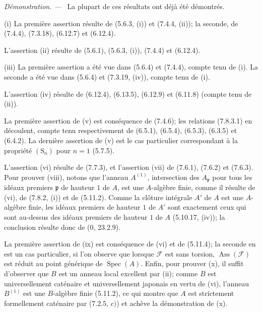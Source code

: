 \documentclass[10pt,oneside]{book}
\newenvironment{proof}{%
  \par\medskip\noindent\textit{Démonstration. ---\ }}{\par}
\begin{document}
\begin{proof}
La plupart de ces résultats ont déjà été démontrés.

(i) La première assertion résulte de (5.6.3, (i)) et (7.4.4, (ii)); la seconde,
de (7.4.4), (7.3.18), (6.12.7) et (6.12.4).

L'assertion (ii) résulte de (5.6.1), (5.6.3, (i)), (7.4.4) et (6.12.4).

(iii) La première assertion a été vue dans (5.6.4) et (7.4.4), compte tenu de
(i). La seconde a été vue dans (5.6.4) et (7.3.19, (iv)), compte tenu de (i).

L'assertion (iv) résulte de (6.12.4), (6.13.5), (6.12.9) et (6.11.8) (compte
tenu de (ii)).

La première assertion de (v) est conséquence de (7.4.6); les relations
(7.8.3.1) en découlent, compte tenu respectivement de (6.5.1), (6.5.4),
(6.5.3), (6.3.5) et (6.4.2). La dernière assertion de (v) est le cas
particulier correspondant à la propriété $(\mathrm S_n)$ pour $n=1$ (5.7.5).

L'assertion (vi) résulte de (7.7.3), et l'assertion (vii) de (7.6.1), (7.6.2)
et (7.6.3). Pour prouver (viii), notons que l'anneau $A^{(1)}$, intersection
des $A_{\mathfrak p}$ pour tous les idéaux premiers $\mathfrak p$ de hauteur
$1$ de $A$, est une $A$-algèbre finie, comme il résulte de (vi), de (7.8.2,
(i)) et de (5.11.2). Comme la clôture intégrale $A'$ de $A$ est une $A$-algèbre
finie, les idéaux premiers de hauteur $1$ de $A'$ sont exactement ceux qui sont
au-dessus des idéaux premiers de hauteur $1$ de $A$ (5.10.17, (iv)); la
conclusion résulte donc de (0, 23.2.9).

La première assertion de (ix) est conséquence de (vi) et de (5.11.4); la
seconde en est un cas particulier, si l'on observe que lorsque $\mathcal F$ est
sans torsion, $\operatorname{Ass}(\mathcal F)$ est réduit au point générique de
$\operatorname{Spec}(A)$. Enfin, pour prouver (x), il suffit d'observer que $B$
est un anneau local excellent par (ii); comme $B$ est universellement caténaire
et universellement japonais en vertu de (vi), l'anneau $B^{(1)}$ est une
$B$-algèbre finie (5.11.2), ce qui montre que $A$ est strictement formellement
caténaire par (7.2.5, $c)$) et achève la démonstration de (x).
\end{proof}
\end{document}
